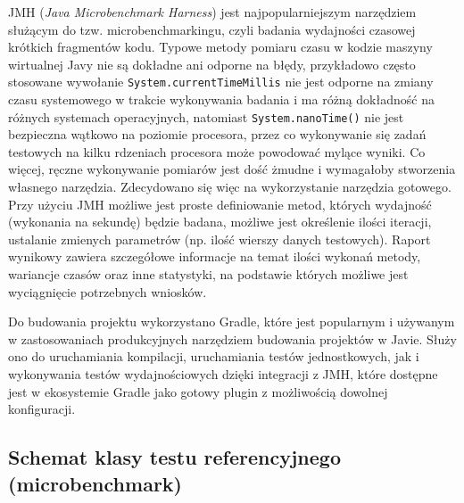 \documentclass[12pt]{extarticle}
\begin{document}
    JMH (\textit{Java Microbenchmark Harness}) jest najpopularniejszym narzędziem służącym do tzw. microbenchmarkingu, czyli badania wydajności czasowej krótkich fragmentów kodu. Typowe metody pomiaru czasu w kodzie maszyny wirtualnej Javy nie są dokładne ani odporne na błędy, przykładowo często stosowane wywołanie \texttt{System.currentTimeMillis} nie jest odporne na zmiany czasu systemowego w trakcie wykonywania badania i ma różną dokładność na różnych systemach operacyjnych, natomiast \texttt{System.nanoTime()} nie jest bezpieczna wątkowo na poziomie procesora, przez co wykonywanie się zadań testowych na kilku rdzeniach procesora może powodować mylące wyniki. Co więcej, ręczne wykonywanie pomiarów jest dość żmudne i wymagałoby stworzenia własnego narzędzia. Zdecydowano się więc na wykorzystanie narzędzia gotowego. Przy użyciu JMH możliwe jest proste definiowanie metod, których wydajność (wykonania na sekundę) będzie badana, możliwe jest określenie ilości iteracji, ustalanie zmienych parametrów (np. ilość wierszy danych testowych). Raport wynikowy zawiera szczegółowe informacje na temat ilości wykonań metody, wariancje czasów oraz inne statystyki, na podstawie których możliwe jest wyciągnięcie potrzebnych wniosków.

    Do budowania projektu wykorzystano Gradle, które jest popularnym i używanym w zastosowaniach produkcyjnych narzędziem budowania projektów w Javie. Służy ono do uruchamiania kompilacji, uruchamiania testów jednostkowych, jak i wykonywania testów wydajnościowych dzięki integracji z JMH, które dostępne jest w ekosystemie Gradle jako gotowy plugin z możliwością dowolnej konfiguracji.

\subsection{Schemat klasy testu referencyjnego (microbenchmark)}
\end{document}
